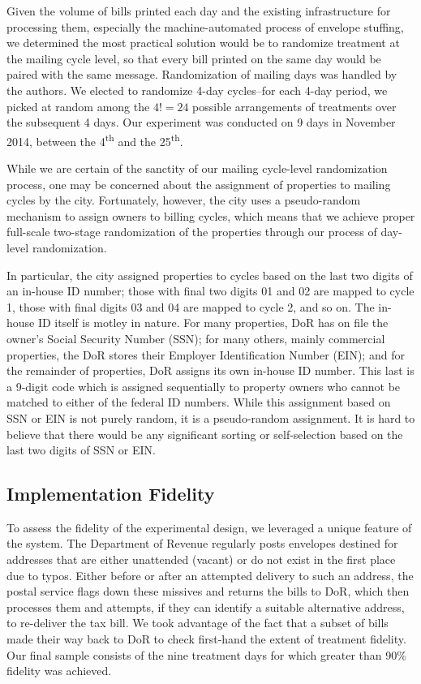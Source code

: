 \documentclass[12pt,titlepage]{article}
\begin{document}
Given the volume of bills printed each day and the existing
infrastructure for processing them, especially the machine-automated
process of envelope stuffing, we determined the most practical
solution would be to randomize treatment at the mailing cycle level,
so that every bill printed on the same day would be paired with the
same message. Randomization of mailing days was handled by the
authors. We elected to randomize 4-day cycles--for each 4-day period,
we picked at random among the $4!=24$ possible arrangements of
treatments over the subsequent 4 days. Our experiment was conducted
on 9 days in November 2014, between the 4\textsuperscript{th} and
the 25\textsuperscript{th}.

While we are certain of the sanctity of our mailing cycle-level
randomization process, one may be concerned about the assignment of
properties to mailing cycles by the city. Fortunately, however, the
city uses a pseudo-random mechanism to assign owners to billing
cycles, which means that we achieve proper full-scale two-stage
randomization of the properties through our process of day-level
randomization.

In particular, the city assigned properties to cycles based on the
last two digits of an in-house ID number; those with final two digits
01 and 02 are mapped to cycle 1, those with final digits 03 and 04 are
mapped to cycle 2, and so on. The in-house ID itself is motley in
nature. For many properties, DoR has on file the owner's Social
Security Number (SSN); for many others, mainly commercial properties,
the DoR stores their Employer Identification Number (EIN); and for the
remainder of properties, DoR assigns its own in-house ID number. This
last is a 9-digit code which is assigned sequentially to property
owners who cannot be matched to either of the federal ID
numbers. While this assignment based on SSN or EIN is not purely
random, it is a pseudo-random assignment. It is hard to believe that
there would be any significant sorting or self-selection based on the
last two digits of SSN or EIN.

\subsection{Implementation Fidelity}

To assess the fidelity of the experimental design, we leveraged a
unique feature of the system. The Department of Revenue regularly
posts envelopes destined for addresses that are either unattended
(vacant) or do not exist in the first place due to typos. Either
before or after an attempted delivery to such an address, the postal
service flags down these missives and returns the bills to DoR, which
then processes them and attempts, if they can identify a suitable
alternative address, to re-deliver the tax bill. We took advantage of
the fact that a subset of bills made their way back to DoR to check
first-hand the extent of treatment fidelity. Our final sample consists
of the nine treatment days for which greater than 90\% fidelity was
achieved.
\end{document}
